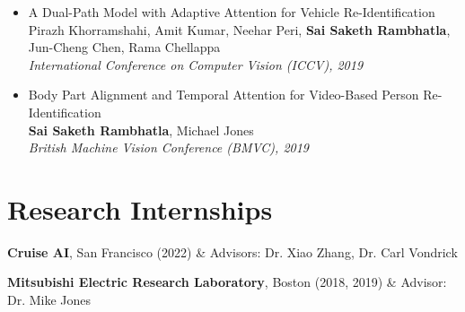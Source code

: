 \documentclass[10pt, letterpaper]{article}
\newcommand{\pub}[3]{\item \begin{minipage}[t]{\linewidth}#1\\#2\\\textcolor{primaryColor!75!black}{\textit{#3}}\end{minipage}} %
\newcommand{\me}{\textbf{Sai Saketh Rambhatla}} %
\let\originalTabularx\tabularx
\let\originalEndTabularx\endtabularx
\renewenvironment{tabularx}{\bgroup\centering\originalTabularx}{\originalEndTabularx\par\egroup}
\begin{document}
\begin{itemize}[itemsep=3pt, parsep=0pt, topsep=2pt]
\pub{A Dual-Path Model with Adaptive Attention for Vehicle Re-Identification}
    {Pirazh Khorramshahi, Amit Kumar, Neehar Peri, \me, Jun-Cheng Chen, Rama Chellappa}
    {International Conference on Computer Vision (ICCV), 2019}

\pub{Body Part Alignment and Temporal Attention for Video-Based Person Re-Identification}
    {\me, Michael Jones}
    {British Machine Vision Conference (BMVC), 2019}



\end{itemize}

    
    \section{Research Internships}

\begin{tabularx}{\textwidth-0.4cm-0.13cm}{@{}lX@{}}
    \textbf{Cruise AI}, San Francisco (2022) & \hfill Advisors: \textcolor{advisorcolor}{Dr. Xiao Zhang, Dr. Carl Vondrick}\\
\end{tabularx}
\begin{tabularx}{\textwidth-0.4cm-0.13cm}{@{}lX@{}}
    \textbf{Mitsubishi Electric Research Laboratory}, Boston (2018, 2019) & \hfill Advisor: \textcolor{advisorcolor}{Dr. Mike Jones}\\
\end{tabularx}
\end{document}
